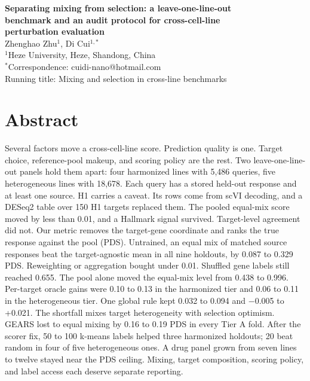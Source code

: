 \documentclass[12pt]{article}
\begin{document}
\begin{singlespace}
\begin{center}
{\LARGE\bfseries Separating mixing from selection: a leave-one-line-out\\[2pt]
benchmark and an audit protocol for cross-cell-line\\[2pt]
perturbation evaluation}\\[18pt]
{\large Zhenghao Zhu$^{1}$, Di Cui$^{1,*}$}\\[6pt]
{\small $^{1}$Heze University, Heze, Shandong, China}\\[4pt]
{\small $^{*}$Correspondence: cuidi-nano@hotmail.com}\\
{\small Running title: Mixing and selection in cross-line benchmarks}
\end{center}
\end{singlespace}

\section*{Abstract}

Several factors move a cross-cell-line score. Prediction quality is one. Target choice, reference-pool makeup, and scoring policy are the rest. Two leave-one-line-out panels hold them apart: four harmonized lines with 5,486 queries, five heterogeneous lines with 18,678. Each query has a stored held-out response and at least one source. H1 carries a caveat. Its rows come from scVI decoding, and a DESeq2 table over 150 H1 targets replaced them. The pooled equal-mix score moved by less than 0.01, and a Hallmark signal survived. Target-level agreement did not. Our metric removes the target-gene coordinate and ranks the true response against the pool (PDS). Untrained, an equal mix of matched source responses beat the target-agnostic mean in all nine holdouts, by 0.087 to 0.329 PDS. Reweighting or aggregation bought under 0.01. Shuffled gene labels still reached 0.655. The pool alone moved the equal-mix level from 0.438 to 0.996. Per-target oracle gains were 0.10 to 0.13 in the harmonized tier and 0.06 to 0.11 in the heterogeneous tier. One global rule kept 0.032 to 0.094 and $-$0.005 to +0.021. The shortfall mixes target heterogeneity with selection optimism. GEARS lost to equal mixing by 0.16 to 0.19 PDS in every Tier A fold. After the scorer fix, 50 to 100 k-means labels helped three harmonized holdouts; 20 beat random in four of five heterogeneous ones. A drug panel grown from seven lines to twelve stayed near the PDS ceiling. Mixing, target composition, scoring policy, and label access each deserve separate reporting.
\end{document}
